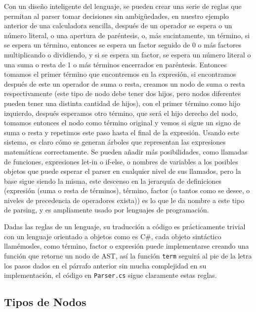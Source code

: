 \documentclass{article}
\begin{document}
Con un diseño inteligente del lenguaje, se pueden crear una serie de reglas que permitan al parser tomar decisiones sin ambigüedades, en nuestro ejemplo anterior de una calculadora sencilla, después de un operador se espera o un número literal, o una apertura de paréntesis, o, más sucintamente, un término, si se espera un término, entonces se espera un factor seguido de 0 o más factores multiplicando o dividiendo, y si se espera un factor, se espera un número literal o una suma o resta de 1 o más términos encerrados en paréntesis. Entonces tomamos el primer término que encontremos en la expresión, si encontramos después de este un operador de suma o resta, creamos un nodo de suma o resta respectivamente (este tipo de nodo debe tener dos hijos, pero nodos diferentes pueden tener una distinta cantidad de hijos), con el primer término como hijo izquierdo, después esperamos otro término, que será el hijo derecho del nodo, tomamos entonces el nodo como término original y vemos si sigue un signo de suma o resta y repetimos este paso hasta el final de la expresión. Usando este sistema, es claro cómo se generan árboles que representan las expresiones matemáticas correctamente. Se pueden añadir más posibilidades, como llamadas de funciones, expresiones let-in o if-else, o nombres de variables a los posibles objetos que puede esperar el parser en cualquier nivel de sus llamados, pero la base sigue siendo la misma, este descenso en la jerarquía de definiciones (expresión (suma o resta de términos), término, factor (o tantos como se desee, o niveles de precedencia de operadores exista)) es lo que le da nombre a este tipo de parsing, y es ampliamente usado por lenguajes de programación.

Dadas las reglas de un lenguaje, su traducción a código es prácticamente trivial con un lenguaje orientado a objetos como es C\#, cada objeto sintáctico llamémosles, como término, factor o expresión puede implementarse creando una función que retorne un nodo de AST, así la función \texttt{term} seguirá al pie de la letra los pasos dados en el párrafo anterior sin mucha complejidad en su implementación, el código en \texttt{Parser.cs} sigue claramente estas reglas.

\subsection{Tipos de Nodos}
\end{document}
